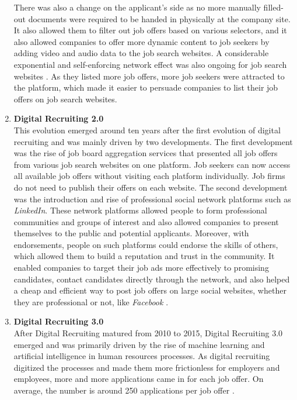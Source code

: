 \documentclass[draft,final]{thesisclass} %
\begin{document}
\begin{enumerate}
    There was also a change on the applicant's side as no more manually filled-out documents were required to be handed in physically at the company site.
    It also allowed them to filter out job offers based on various selectors, and it also allowed companies to offer more dynamic content to job seekers by adding video and audio data to the job search websites.
    A considerable exponential and self-enforcing network effect was also ongoing for job search websites \parencite[3]{ai_recruiting}.
    As they listed more job offers, more job seekers were attracted to the platform, which made it easier to persuade companies to list their job offers on job search websites.
    \item \textbf{Digital Recruiting 2.0} \label{digital_recruiting_2}\\
    This evolution emerged around ten years after the first evolution of digital recruiting and was mainly driven by two developments.
    The first development was the rise of job board aggregation services that presented all job offers from various job search websites on one platform.
    Job seekers can now access all available job offers without visiting each platform individually. Job firms do not need to publish their offers on each website.
    The second development was the introduction and rise of professional social network platforms such as \textit{LinkedIn}.
    These network platforms allowed people to form professional communities and groups of interest and also allowed companies to present themselves to the public and potential applicants.
    Moreover, with endorsements, people on such platforms could endorse the skills of others, which allowed them to build a reputation and trust in the community.
    It enabled companies to target their job ads more effectively to promising candidates, contact candidates directly through the network, and also helped a cheap and efficient way to post job offers on large social websites, whether they are professional or not, like \textit{Facebook} \parencite[3]{ai_recruiting}.
    \item \textbf{Digital Recruiting 3.0} \label{digital_recruiting_3}\\
    After Digital Recruiting matured from 2010 to 2015, Digital Recruiting 3.0 emerged and was primarily driven by the rise of machine learning and artificial intelligence in human resources processes.
    As digital recruiting digitized the processes and made them more frictionless for employers and employees, more and more applications came in for each job offer. On average, the number is around 250 applications per job offer \parencite[4]{ai_recruiting}.

\end{enumerate}
\end{document}
